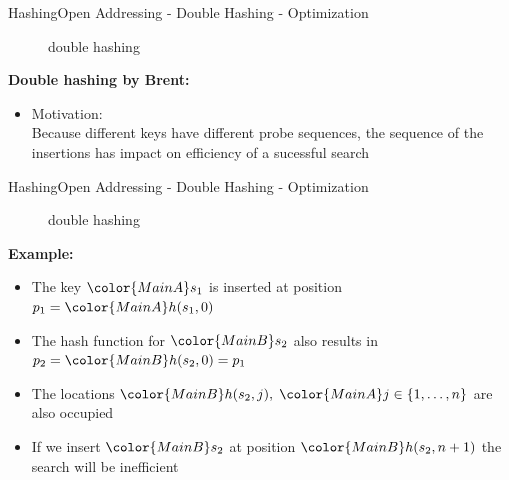\begin{frame}{Hashing}{Open Addressing - Double Hashing - Optimization}
  \vspace{-2.0em}
  \begin{figure}[!h]
    \begin{adjustbox}{width=0.9\linewidth}%
    \end{adjustbox}
    \vspace{-1.0em}
    \caption{double hashing}%
    \label{fig:hashing:open_addressing:double_hashing_no_brent}%
  \end{figure}
  \textbf{Double hashing by Brent:}
  \begin{itemize}
    \item<2-> Motivation:\\
      Because different keys have different probe sequences,
      the sequence of the insertions has impact on efficiency of a sucessful search
  \end{itemize}
\end{frame}


\begin{frame}{Hashing}{Open Addressing - Double Hashing - Optimization}
  \vspace{-2.0em}
  \begin{figure}[!h]
    \begin{adjustbox}{width=0.9\linewidth}%
    \end{adjustbox}
    \vspace{-1.0em}
    \caption{double hashing}%
    \label{fig:hashing:open_addressing:double_hashing_no_brent2}%
  \end{figure}
  \vspace{-1.0em}
  \textbf{Example:}
  \begin{itemize}
    \item<1->
      The key ${\color{MainA}s_1}$ is inserted at position
      \begin{math}
        p_1 = {\color{MainA}h(s_1, 0)}
      \end{math}
    \item<2->
      The hash function for ${\color{MainB}s_2}$ also results in
      \begin{math}
        p_2 = {\color{MainB}h(s_2, 0)} = p_1
      \end{math}
    \item<3->
      The locations
      \begin{math}
        {\color{MainB}h(s_2, j)}, \;
        {\color{MainA}j} \in \{1,\dots,n\}
      \end{math}
      are also occupied
    \item<6->
      If we insert ${\color{MainB}s_2}$ at position
      ${\color{MainB}h(s_2, n + 1)}$ the search will be inefficient
  \end{itemize}
\end{frame}


